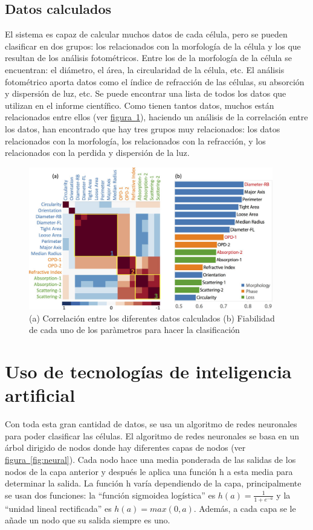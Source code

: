 \documentclass[a4paper, 12pt, UTF8]{article}
\begin{document}
\subsection{Datos calculados}
El sistema es capaz de calcular muchos datos de cada célula, pero se pueden clasificar en dos grupos: los relacionados con la morfología de la célula y los que resultan de los análisis fotométricos. Entre los de la morfología de la célula se encuentran: el diámetro, el área, la circularidad de la célula, etc. El análisis fotométrico aporta datos como el índice de refracción de las células, su absorción y dispersión de luz, etc. Se puede encontrar una lista de todos los datos que utilizan en el informe científico. Como tienen tantos datos, muchos están relacionados entre ellos (ver \hyperref[fig:features]{figura~\ref{fig:features}}), haciendo un análisis de la correlación entre los datos, han encontrado que hay tres grupos muy relacionados: los datos relacionados con la morfología, los relacionados con la refracción, y los relacionados con la perdida y dispersión de la luz.

\begin{figure}[h!]
	\centering
	\includegraphics[width=0.95\textwidth]{features}
	\caption{(a) Correlación entre los diferentes datos calculados
		(b) Fiabilidad de cada uno de los paràmetros para hacer la clasificación}
	\label{fig:features}
\end{figure}

\section{Uso de tecnologías de inteligencia artificial}

Con toda esta gran cantidad de datos, se usa un algoritmo de redes neuronales para poder clasificar las células. El algoritmo de redes neuronales se basa en un árbol dirigido de nodos donde hay diferentes capas de nodos (ver \hyperref[fig:neural]{figura~\ref{fig:neural}}). Cada nodo hace una media ponderada de las salidas de los nodos de la capa anterior y después le aplica una función h a esta media para determinar la salida. La función h varía dependiendo de la capa, principalmente se usan dos funciones: la “función sigmoidea logística” es $h(a)=\frac{1}{1+e^{-a}}$ y la “unidad lineal rectificada” es $h(a)=max(0,a)$. Además, a cada capa se le añade un nodo que su salida siempre es uno. 
	
\end{document}

